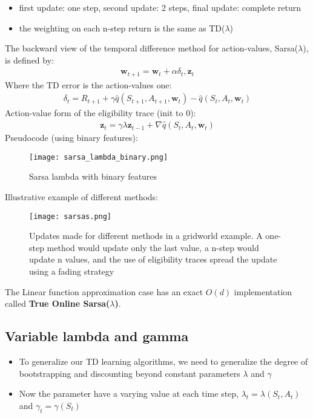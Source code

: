 \documentclass[sutton_barto_notes.tex]{subfiles}
\begin{document}
\begin{itemize}
\item first update: one step, second update: 2 steps, final update: complete return 
\item the weighting on each n-step return is the same as TD($\lambda$) 
\end{itemize}
 The backward view of the temporal difference method for action-values, Sarsa($\lambda$), is defined by: 
\begin{align}
\mathbf{w}_{t+1} = \mathbf{w}_{t} + \alpha \delta_t, \mathbf{z}_{t}  \label{eq:12.14}\tag{12.14}
\end{align}
 Where the TD error is the action-values one: 
\begin{align}
\delta_t = R_{t+1} + \gamma \hat{q}(S_{t+1}, A_{t+1}, \mathbf{w}_{t}) - \hat{q}(S_{t}, A_{t}, \mathbf{w}_{t})  \label{eq:12.15}\tag{12.15}
\end{align}
 Action-value form of the eligibility trace (init to 0): 
\begin{align}
\mathbf{z}_{t} = \gamma \lambda \mathbf{z}_{t-1} + \nabla \hat{q}(S_t, A_t, \mathbf{w}_{t})  \label{eq:12.16}\tag{12.16}
\end{align}
 Pseudocode (using binary features): 
\begin{figure}[h!]
    \centering
     \texttt{[image: sarsa\_lambda\_binary.png]}
    \caption{ Sarsa lambda with binary features }
\end{figure}
 Illustrative example of different methods: 
\begin{figure}[h!]
    \centering
     \texttt{[image: sarsas.png]}
    \caption{ Updates made for different methods in a gridworld example. A one-step method would update only the last value, a n-step would update n values, and the use of eligibility traces spread the update using a fading strategy }
\end{figure}

 The Linear function approximation case has an exact $O(d)$ implementation called \textbf{True Online Sarsa($\lambda$)}. 


\subsection{Variable lambda and gamma}

\begin{itemize}
\item To generalize our TD learning algorithms, we need to generalize the degree of bootstrapping and discounting beyond constant parameters $\lambda$ and $\gamma$ 
\item Now the parameter have a varying value at each time step, $\lambda_t = \lambda(S_t, A_t)$ and $\gamma_t = \gamma(S_t)$ 
\end{itemize}
\end{document}

